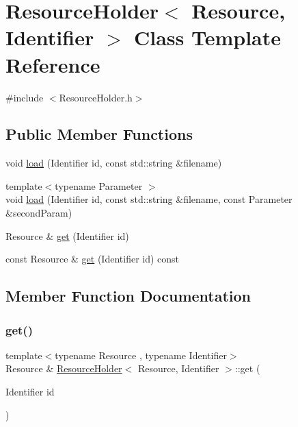\hypertarget{class_resource_holder}{}\section{Resource\+Holder$<$ Resource, Identifier $>$ Class Template Reference}
\label{class_resource_holder}


{\ttfamily \#include $<$Resource\+Holder.\+h$>$}

\subsection*{Public Member Functions}
\begin{DoxyCompactItemize}
\item 
void \hyperlink{class_resource_holder_accb6a2b6bd2da503ddfd57b5c0028a16}{load} (Identifier id, const std\+::string \&filename)
\item 
{\footnotesize template$<$typename Parameter $>$ }\\void \hyperlink{class_resource_holder_ae83a7a88b2b2a74b6143796eb4452110}{load} (Identifier id, const std\+::string \&filename, const Parameter \&second\+Param)
\item 
Resource \& \hyperlink{class_resource_holder_a6452638a75b6df7ea7d610f204632850}{get} (Identifier id)
\item 
const Resource \& \hyperlink{class_resource_holder_aaf453199dbdfb9b8395c52b29eb915c2}{get} (Identifier id) const
\end{DoxyCompactItemize}


\subsection{Member Function Documentation}
\hypertarget{class_resource_holder_a6452638a75b6df7ea7d610f204632850}{}\label{class_resource_holder_a6452638a75b6df7ea7d610f204632850} 
\subsubsection{\texorpdfstring{get()}{get()}\hspace{0.1cm}{\footnotesize\ttfamily [1/2]}}
{\footnotesize\ttfamily template$<$typename Resource , typename Identifier$>$ \\
Resource \& \hyperlink{class_resource_holder}{Resource\+Holder}$<$ Resource, Identifier $>$\+::get (\begin{DoxyParamCaption}\item[{Identifier}]{id }\end{DoxyParamCaption})}

